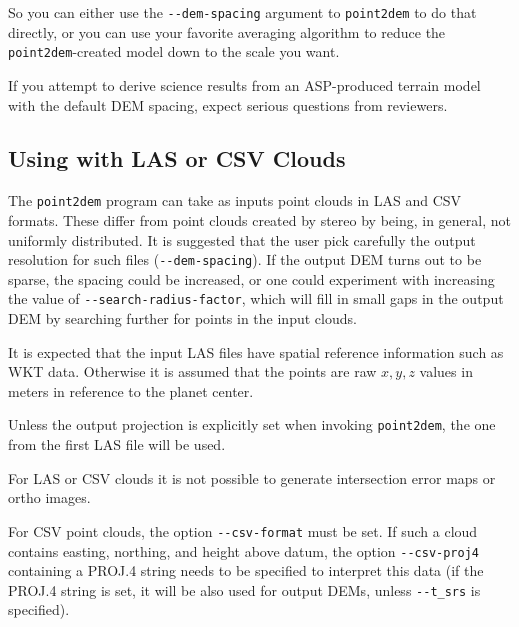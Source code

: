 So you can either use the \texttt{-\/-dem-spacing} argument to
\texttt{point2dem} to do that directly, or you can use your
favorite averaging algorithm to reduce the \texttt{point2dem}-created
model down to the scale you want.

If you attempt to derive science results from an ASP-produced terrain model
with the default \ac{DEM} spacing, expect serious questions from reviewers.

\subsection{Using with LAS or CSV Clouds}

The \texttt{point2dem} program can take as inputs point clouds in LAS
and CSV formats. These differ from point clouds created by stereo by
being, in general, not uniformly distributed.  It is suggested that the
user pick carefully the output resolution for such files
(\texttt{-\/-dem-spacing}). If the output \ac{DEM} turns out to be sparse,
the spacing could be increased, or one could experiment with increasing
the value of \texttt{-\/-search-radius-factor}, which will fill in small
gaps in the output \ac{DEM} by searching further for points in the input
clouds.

It is expected that the input LAS files have spatial reference
information such as WKT data. Otherwise it is assumed that the points
are raw $x,y,z$ values in meters in reference to the planet center.

Unless the output projection is explicitly set when invoking \texttt{point2dem},
the one from the first LAS file will be used.

For LAS or CSV clouds it is not possible to generate intersection error
maps or ortho images.

For CSV point clouds, the option \texttt{-\/-csv-format} must be set. If
such a cloud contains easting, northing, and height above datum, the
option \texttt{-\/-csv-proj4} containing a PROJ.4 string needs to be
specified to interpret this data (if the PROJ.4 string is set, it will be also
used for output DEMs, unless \texttt{-\/-t\_srs} is specified).

